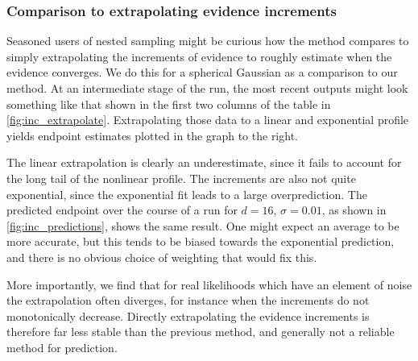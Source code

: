 \documentclass[usenatbib]{mnras}
\begin{document}
\subsubsection*{Comparison to extrapolating evidence increments}
Seasoned users of nested sampling might be curious how the method compares to simply extrapolating the increments of evidence to roughly estimate when the evidence converges. We do this for a spherical Gaussian as a comparison to our method. At an intermediate stage of the run, the most recent outputs might look something like that shown in the first two columns of the table in \cref{fig:inc_extrapolate}. Extrapolating those data to a linear and exponential profile yields endpoint estimates plotted in the graph to the right. 
\par
The linear extrapolation is clearly an underestimate, since it fails to account for the long tail of the nonlinear profile. The increments are also not quite exponential, since the exponential fit leads to a large overprediction. The predicted endpoint over the course of a run for $d = 16$, $\sigma = 0.01$, as shown in \cref{fig:inc_predictions}, shows the same result. One might expect an average to be more accurate, but this tends to be biased towards the exponential prediction, and there is no obvious choice of weighting that would fix this.
\par
More importantly, we find that for real likelihoods which have an element of noise the extrapolation often diverges, for instance when the increments do not monotonically decrease. Directly extrapolating the evidence increments is therefore far less stable than the previous method, and generally not a reliable method for prediction.
\end{document}

